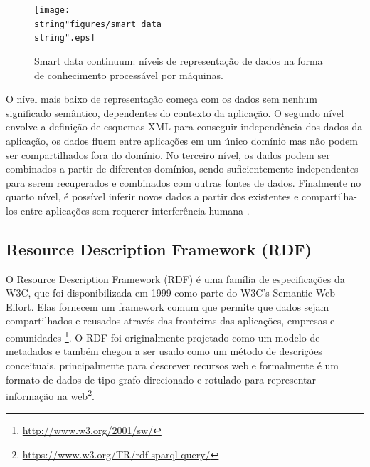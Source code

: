 \begin{figure}[H]
\centering{}\texttt{[image: \\string"figures/smart data\\string".eps]}\caption{\foreignlanguage{english}{Smart data continuum\foreignlanguage{brazil}{: níveis de representação
de dados na forma de conhecimento processável por máquinas.\label{fig:Smart-data-continuum}}}}
\end{figure}

O nível mais baixo de representação começa com os dados sem nenhum
significado semântico, dependentes do contexto da aplicação. O segundo
nível envolve a definição de esquemas \foreignlanguage{english}{XML}
para conseguir independência dos dados da aplicação, os dados fluem
entre aplicações em um único domínio mas não podem ser compartilhados
fora do domínio. No terceiro nível, os dados podem ser combinados
a partir de diferentes domínios, sendo suficientemente independentes
para serem recuperados e combinados com outras fontes de dados. Finalmente
no quarto nível, é possível inferir novos dados a partir dos existentes
e compartilha-los entre aplicações sem requerer interferência humana
\citep{sugumaran2011}.
%

\subsection*{Resource Description Framework\foreignlanguage{brazil}{ (}RDF\foreignlanguage{brazil}{)}}

%
O \foreignlanguage{english}{Resource Description Framework (RDF)}
é uma família de especificações da W3C, que foi disponibilizada em
1999 como parte do W3C's \foreignlanguage{english}{Semantic Web Effort}.
Elas fornecem um \foreignlanguage{english}{framework} comum que permite
que dados sejam compartilhados e reusados através das fronteiras das
aplicações, empresas e comunidades \footnote{\url{http://www.w3.org/2001/sw/}}.
O \foreignlanguage{english}{RDF} foi originalmente projetado como
um modelo de metadados e também chegou a ser usado como um método
de descrições conceituais, principalmente para descrever recursos
web e formalmente é um formato de dados de tipo grafo direcionado
e rotulado para representar informação na web\footnote{\url{https://www.w3.org/TR/rdf-sparql-query/}}.

